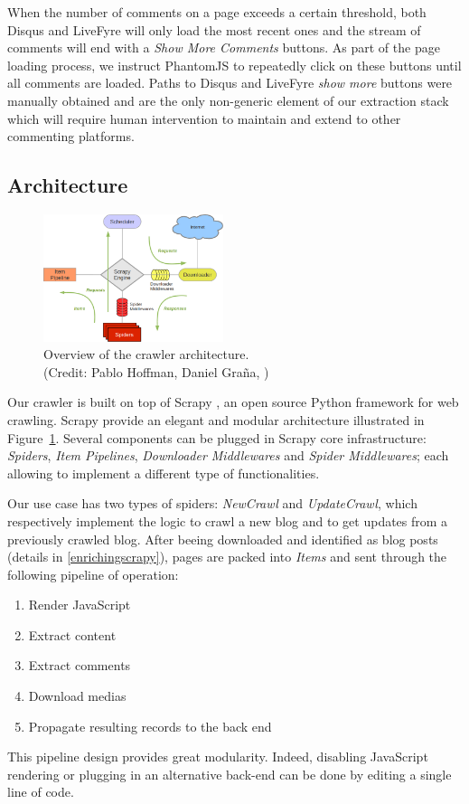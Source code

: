 When the number of comments on a page exceeds a certain threshold, both Disqus and LiveFyre will only load the most recent ones and the stream of comments will end with a \emph{Show More Comments} buttons. As part of the page loading process, we instruct PhantomJS to repeatedly click on these buttons until all comments are loaded. Paths to Disqus and LiveFyre \emph{show more} buttons were manually obtained and are the only non-generic element of our extraction stack which will require human intervention to maintain and extend to other commenting platforms.


\subsection{Architecture}

\begin{figure}
  \capstart
  \centering
  \includegraphics[width=0.47\textwidth]{img/scrapy_architecture.png}
  \caption{Overview of the crawler architecture.\\(Credit: Pablo Hoffman, Daniel Graña, \cite{scrapy2013})}
  \label{architecture}
\end{figure}

Our crawler is built on top of Scrapy \cite{scrapy2013}, an open source Python framework for web crawling. Scrapy provide an elegant and modular architecture illustrated in Figure~\ref{architecture}. Several components can be plugged in Scrapy core infrastructure: \emph{Spiders}, \emph{Item Pipelines}, \emph{Downloader Middlewares} and \emph{Spider Middlewares}; each allowing to implement a different type of functionalities.

Our use case has two types of spiders: \emph{NewCrawl} and \emph{UpdateCrawl}, which respectively implement the logic to crawl a new blog and to get updates from a previously crawled blog. After beeing downloaded and identified as blog posts (details in \ref{enrichingscrapy}), pages are packed into \emph{Items} and sent through the following pipeline of operation:
\begin{enumerate}[noitemsep]
  \item Render JavaScript
  \item Extract content
  \item Extract comments
  \item Download medias
  \item Propagate resulting records to the back end
\end{enumerate}
This pipeline design provides great modularity. Indeed, disabling JavaScript rendering or plugging in an alternative back-end can be done by editing a single line of code.


